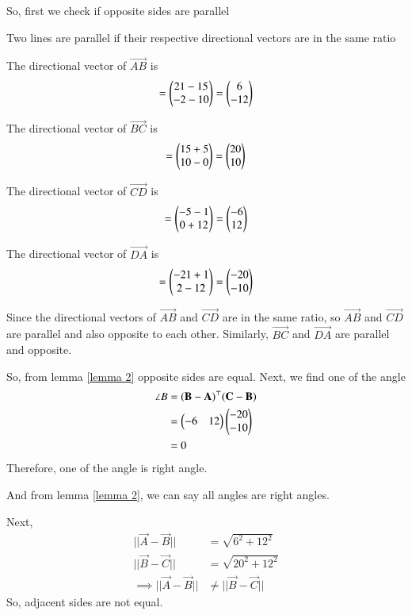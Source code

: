 \documentclass[journal,12pt,twocolumn]{IEEEtran}
\begin{document}
So, first we check if opposite sides are parallel

Two lines are parallel if their respective
directional vectors are in the same ratio

The directional vector of $\vec{AB}$ is
\begin{align}
    = \begin{pmatrix}21-15 \\ -2-10\end{pmatrix} = \begin{pmatrix}6 \\ -12\end{pmatrix}
\end{align}

The directional vector of $\vec{BC}$ is
\begin{align}
    = \begin{pmatrix}15+5 \\ 10-0\end{pmatrix} = \begin{pmatrix}20 \\ 10\end{pmatrix}
\end{align}

The directional vector of $\vec{CD}$ is
\begin{align}
    = \begin{pmatrix}-5-1 \\ 0+12\end{pmatrix} = \begin{pmatrix}-6 \\ 12\end{pmatrix}
\end{align}

The directional vector of $\vec{DA}$ is
\begin{align}
    = \begin{pmatrix}-21+1 \\ 2-12\end{pmatrix} = \begin{pmatrix}-20 \\ -10\end{pmatrix}
\end{align}

Since the directional vectors of $\vec{AB}$ and $\vec{CD}$
are in the same ratio, so  $\vec{AB}$ and $\vec{CD}$ are
parallel and also opposite to each other.
Similarly, $\vec{BC}$ and $\vec{DA}$ are parallel and opposite.

So, from lemma \ref{lemma 2} opposite sides are equal.
Next, we find one of the angle
\begin{align}
    \angle B &= (\mathbf{\mathbf{B} - \mathbf{A}})^\top(\mathbf{\mathbf{C} - \mathbf{B}}) \\ 
    &= \begin{pmatrix}-6 & 12\end{pmatrix} \begin{pmatrix}-20 \\ -10\end{pmatrix}\\
    &= 0
\end{align}
Therefore, one of the angle is right angle.

And from lemma \ref{lemma 2}, we can say all angles are right angles.

Next, 
\begin{align}
    ||\vec{A}-\vec{B}|| &= \sqrt{6^2 + 12^2}\\
    ||\vec{B}-\vec{C}|| &= \sqrt{20^2 + 12^2}\\
    \implies ||\vec{A}-\vec{B}|| &\ne ||\vec{B}-\vec{C}||
\end{align}
So, adjacent sides are not equal.
\end{document}
